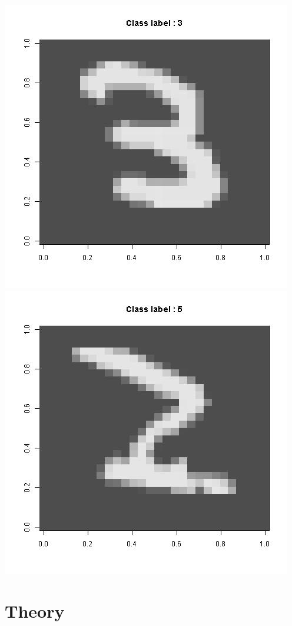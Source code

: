 \documentclass[a4paper]{article}
\begin{document}
\includegraphics{3.jpg} \\
\includegraphics{5.jpg} \\

\setcounter{secnumdepth}{1}

\section{Theory}
\end{document}
